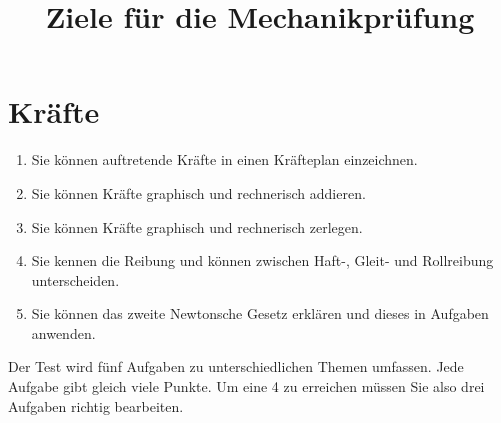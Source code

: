 \documentclass[12pt,a4paper,twoside]{article}
\title{Ziele für die Mechanikprüfung}
\date{}
\begin{document}
\maketitle

\section*{Kräfte}

\begin{enumerate}
	\item Sie können auftretende Kräfte in einen Kräfteplan einzeichnen.
	\item Sie können Kräfte graphisch und rechnerisch addieren.
	\item Sie können Kräfte graphisch und rechnerisch zerlegen.
	\item Sie kennen die Reibung und können zwischen Haft-, Gleit- und Rollreibung unterscheiden.
	\item Sie können das zweite Newtonsche Gesetz erklären und dieses in Aufgaben anwenden.

\end{enumerate}

Der Test wird fünf Aufgaben zu unterschiedlichen Themen umfassen. Jede Aufgabe gibt gleich viele Punkte.
Um eine 4 zu erreichen müssen Sie also drei Aufgaben richtig bearbeiten.
\end{document}
